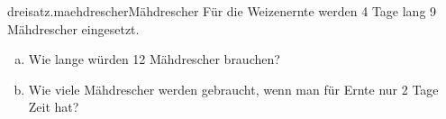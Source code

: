 \begin{exercise}{dreisatz.maehdrescher}{Mähdrescher}
  \ifproblem\problem
    Für die Weizenernte werden 4 Tage lang 9 Mähdrescher eingesetzt.
    \begin{enumerate}[a)]
      \item Wie lange würden 12 Mähdrescher brauchen?
      \item Wie viele Mähdrescher werden gebraucht, wenn man für Ernte nur 2 Tage Zeit hat?
    \end{enumerate}
  \fi
\end{exercise}
